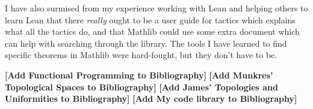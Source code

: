 I have also surmised from my experience working with Lean and helping
others to learn Lean that there \textit{really} ought to be a user guide
for tactics which explains what all the tactics do, and that Mathlib could
use some extra document which can help with searching through the library. 
The tools I have learned to find specific theorems in Mathlib were hard-fought,
but they don't have to be.

\textbf{[Add Functional Programming to Bibliography]}
\textbf{[Add Munkres' Topological Spaces to Bibliography]}
\textbf{[Add James' Topologies and Uniformities to Bibliography]}
\textbf{[Add My code library to Bibliography]}